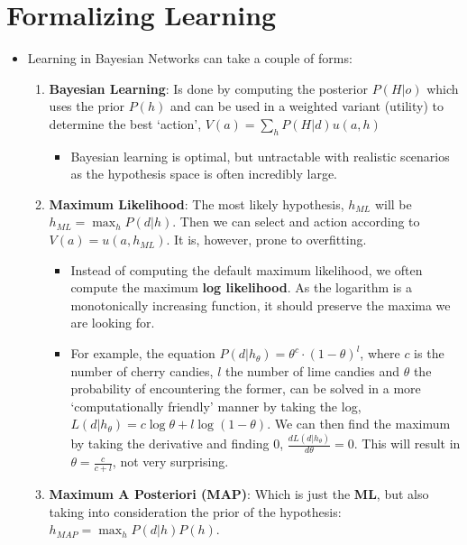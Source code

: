 \documentclass[
]{book}
\providecommand{\tightlist}{%
  \setlength{\itemsep}{0pt}\setlength{\parskip}{0pt}}
\begin{document}
\hypertarget{formalizing-learning}{%
\section{Formalizing Learning}\label{formalizing-learning}}

\begin{itemize}
\item
  Learning in Bayesian Networks can take a couple of forms:

  \begin{enumerate}
  \def\labelenumi{\arabic{enumi}.}
  \item
    \textbf{Bayesian Learning}: Is done by computing the posterior
    \(P(H|o)\) which uses the prior \(P(h)\) and can be used in a
    weighted variant (utility) to determine the best `action',
    \(V(a) = \sum_h P(H|d)u(a, h)\)

    \begin{itemize}
    \tightlist
    \item
      Bayesian learning is optimal, but untractable with realistic
      scenarios as the hypothesis space is often incredibly large.
    \end{itemize}
  \item
    \textbf{Maximum Likelihood}: The most likely hypothesis, \(h_{ML}\)
    will be \(h_{ML} = \max_h P(d|h)\). Then we can select and action
    according to \(V(a) = u(a, h_{ML})\). It is, however, prone to
    overfitting.

    \begin{itemize}
    \item
      Instead of computing the default maximum likelihood, we often
      compute the maximum \textbf{log likelihood}. As the logarithm is a
      monotonically increasing function, it should preserve the maxima
      we are looking for.
    \item
      For example, the equation
      \(P(d|h_\theta) = \theta^c \cdot (1 - \theta)^l\), where \(c\) is
      the number of cherry candies, \(l\) the number of lime candies and
      \(\theta\) the probability of encountering the former, can be
      solved in a more `computationally friendly' manner by taking the
      log, \(L(d|h_\theta) = c \log \theta + l \log (1-\theta)\). We can
      then find the maximum by taking the derivative and finding \(0\),
      \(\frac{d L(d|h_\theta)}{d\theta}=0\). This will result in
      \(\theta = \frac{c}{c + l}\), not very surprising.
    \end{itemize}
  \item
    \textbf{Maximum A Posteriori (MAP)}: Which is just the \textbf{ML},
    but also taking into consideration the prior of the hypothesis:
    \(h_{MAP} = \max_h P(d|h)P(h)\).


\end{enumerate}
\end{itemize}
\end{document}
